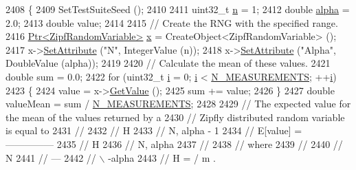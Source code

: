 \begin{DoxyCode}
2408 \{
2409   SetTestSuiteSeed ();
2410 
2411   uint32\_t \hyperlink{namespacesample-rng-plot_aeb5ee5c431e338ef39b7ac5431242e1d}{n} = 1;
2412   \textcolor{keywordtype}{double} \hyperlink{lte__uplink__power__control_8m_a62197192f0fbf4e0675eb37be1c4c175}{alpha} = 2.0;
2413   \textcolor{keywordtype}{double} value;
2414 
2415   \textcolor{comment}{// Create the RNG with the specified range.}
2416   \hyperlink{classns3_1_1Ptr}{Ptr<ZipfRandomVariable>} \hyperlink{lte__link__budget__x2__handover__measures_8m_a9336ebf25087d91c818ee6e9ec29f8c1}{x} = CreateObject<ZipfRandomVariable> ();
2417   x->\hyperlink{classns3_1_1ObjectBase_ac60245d3ea4123bbc9b1d391f1f6592f}{SetAttribute} (\textcolor{stringliteral}{"N"}, IntegerValue (n));
2418   x->\hyperlink{classns3_1_1ObjectBase_ac60245d3ea4123bbc9b1d391f1f6592f}{SetAttribute} (\textcolor{stringliteral}{"Alpha"}, DoubleValue (alpha));
2419 
2420   \textcolor{comment}{// Calculate the mean of these values.}
2421   \textcolor{keywordtype}{double} sum = 0.0;
2422   \textcolor{keywordflow}{for} (uint32\_t \hyperlink{bernuolliDistribution_8m_a6f6ccfcf58b31cb6412107d9d5281426}{i} = 0; \hyperlink{bernuolliDistribution_8m_a6f6ccfcf58b31cb6412107d9d5281426}{i} < \hyperlink{classRandomVariableStreamZipfTestCase_a452b211d67b349e2e54898720f68901f}{N\_MEASUREMENTS}; ++\hyperlink{bernuolliDistribution_8m_a6f6ccfcf58b31cb6412107d9d5281426}{i})
2423     \{
2424       value = x->\hyperlink{classns3_1_1ZipfRandomVariable_a327ce77bd92ece90f8622b5104850676}{GetValue} ();
2425       sum += value;
2426     \}
2427   \textcolor{keywordtype}{double} valueMean = sum / \hyperlink{classRandomVariableStreamZipfTestCase_a452b211d67b349e2e54898720f68901f}{N\_MEASUREMENTS};
2428 
2429   \textcolor{comment}{// The expected value for the mean of the values returned by a}
2430   \textcolor{comment}{// Zipfly distributed random variable is equal to }
2431   \textcolor{comment}{//}
2432   \textcolor{comment}{//                   H}
2433   \textcolor{comment}{//                    N, alpha - 1}
2434   \textcolor{comment}{//     E[value]  =  ---------------}
2435   \textcolor{comment}{//                     H}
2436   \textcolor{comment}{//                      N, alpha}
2437   \textcolor{comment}{//                          }
2438   \textcolor{comment}{// where}
2439   \textcolor{comment}{//}
2440   \textcolor{comment}{//                    N   }
2441   \textcolor{comment}{//                   ---    }
2442   \textcolor{comment}{//                   \(\backslash\)     -alpha}
2443   \textcolor{comment}{//     H          =  /    m        .}

\end{DoxyCode}
